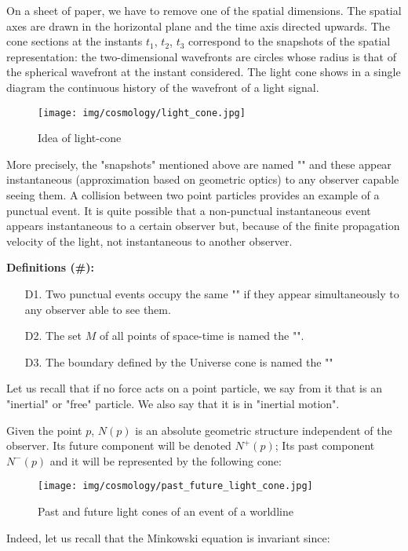	On a sheet of paper, we have to remove one of the spatial dimensions. The spatial axes are drawn in the horizontal plane and the time axis directed upwards. The cone sections at the instants $t_1$, $t_2$, $t_3$ correspond to the snapshots of the spatial representation: the two-dimensional wavefronts are circles whose radius is that of the spherical wavefront at the instant considered. The light cone shows in a single diagram the continuous history of the wavefront of a light signal.
	\begin{figure}[H]
		\centering
		\texttt{[image: img/cosmology/light\_cone.jpg]}
		\caption{Idea of light-cone}	
	\end{figure}
	More precisely, the "snapshots" mentioned above are named "" and these appear instantaneous (approximation based on geometric optics) to any observer capable seeing them. A collision between two point particles provides an example of a punctual event. It is quite possible that a non-punctual instantaneous event appears instantaneous to a certain observer but, because of the finite propagation velocity of the light, not instantaneous to another observer.

	\textbf{Definitions (\#\mydef):}
	\begin{itemize}
		\item[D1.] Two punctual events occupy the same "" if they appear simultaneously to any observer able to see them.

		\item[D2.] The set $M$ of all points of space-time is named the "".

		\item[D3.] The boundary defined by the Universe cone is named the ""
	\end{itemize}
	Let us recall that if no force acts on a point particle, we say from it that is an "inertial" or "free" particle. We also say that it is in "inertial motion".

	Given the point $p$, $N(p)$ is an absolute geometric structure independent of the observer. Its future component will be denoted $N^{+}(p)$; Its past component $N^{-}(p)$ and it will be represented by the following cone:
	\begin{figure}[H]
		\centering
		\texttt{[image: img/cosmology/past\_future\_light\_cone.jpg]}
		\caption{Past and future light cones of an event of a worldline}	
	\end{figure}
	Indeed, let us recall that the Minkowski equation is invariant since:
	
